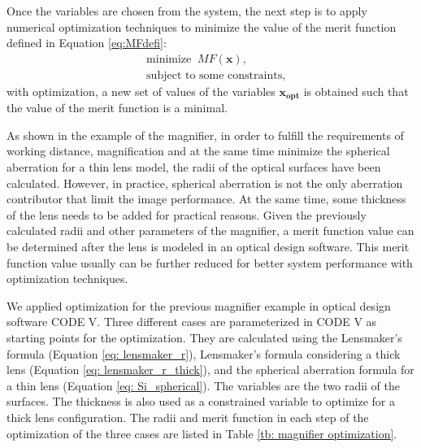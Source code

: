 Once the variables are chosen from the system, the next step is to apply numerical optimization techniques to minimize the value of the merit function defined in Equation \ref{eq:MFdefi}:
\begin{equation} \label{eq:MFopt_cp1}
\begin{split}
& \text{minimize}\;\; MF(\pmb{x}) ,\\
& \text{subject to some constraints},
\end{split}
\end{equation}
with optimization, a new set of values of the variables $\pmb{x_{opt}}$ is obtained such that the value of the merit function is a minimal.

As shown in the example of the magnifier, in order to fulfill the requirements of working distance, magnification and at the same time minimize the spherical aberration for a thin lens model, the radii of the optical surfaces have been calculated. However, in practice, spherical aberration is not the only aberration contributor that limit the image performance. At the same time, some thickness of the lens needs to be added for practical reasons. Given the previously calculated radii and other parameters of the magnifier, a merit function value can be determined after the lens is modeled in an optical design software. This merit function value usually can be further reduced for better system performance with optimization techniques.  

We applied optimization for the previous magnifier example in optical design software CODE V. Three different cases are parameterized in CODE V as starting points for the optimization. They are calculated using the Lensmaker's formula  (Equation \ref{eq: lensmaker_r}), Lensmaker's formula considering a thick lens (Equation \ref{eq: lensmaker_r_thick}), and the spherical aberration formula for a thin lens (Equation \ref{eq: Si_spherical}). The variables are the two radii of the surfaces. The thickness is also used as a constrained variable to optimize for a thick lens configuration. The radii and merit function in each step of the optimization of the three cases are listed in Table \ref{tb: magnifier optimization}. 

